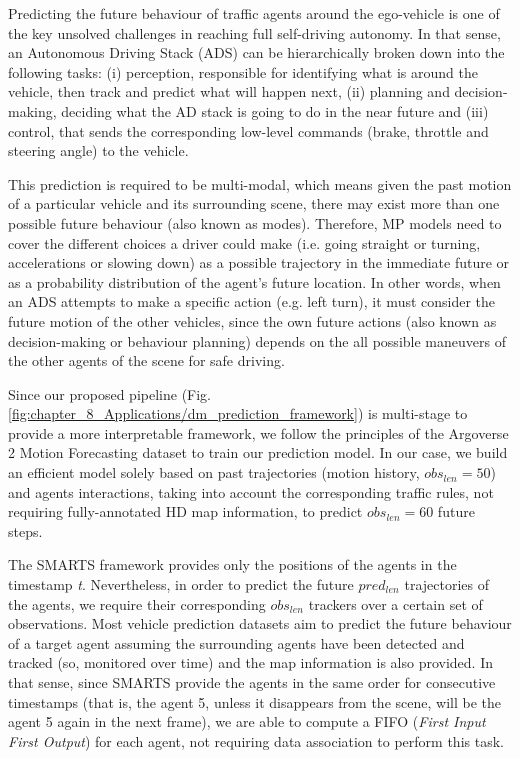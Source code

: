 Predicting the future behaviour of traffic agents \cite{wilson2023argoverse} around the ego-vehicle is one of the key unsolved challenges in reaching full self-driving autonomy. In that sense, an Autonomous Driving Stack (ADS) can be hierarchically broken down into the following tasks: (i) perception, responsible for identifying what is around the vehicle, then track and predict what will happen next, (ii) planning and decision-making, deciding what the AD stack is going to do in the near future and (iii) control, that sends the corresponding low-level commands (brake, throttle and steering angle) to the vehicle. 

This prediction is required to be multi-modal, which means given the past motion of a particular vehicle and its surrounding scene, there may exist more than one possible future behaviour (also known as modes). Therefore, MP models need to cover the different choices a driver could make (i.e. going straight or turning, accelerations or slowing down) as a possible trajectory in the immediate future or as a probability distribution of the agent's future location. In other words, when an ADS attempts to make a specific action (e.g. left turn), it must consider the future motion of the other vehicles, since the own future actions (also known as decision-making or behaviour planning) depends on the all possible maneuvers of the other agents of the scene for safe driving. %

Since our proposed pipeline (Fig. \ref{fig:chapter_8_Applications/dm_prediction_framework}) is multi-stage to provide a more interpretable framework, we follow the principles of the Argoverse 2 Motion Forecasting dataset \cite{wilson2023argoverse} to train our prediction model. In our case, we build an efficient model solely based on past trajectories (motion history, $obs_{len} = 50$) and agents interactions, taking into account the corresponding traffic rules, not requiring fully-annotated HD map information, to predict $obs_{len} = 60$ future steps. %

The SMARTS \cite{SMARTS} framework provides only the positions of the agents in the timestamp \textit{t}. Nevertheless, in order to predict the future $pred_{len}$ trajectories of the agents, we require their corresponding $obs_{len}$ trackers over a certain set of observations. Most vehicle prediction datasets \cite{wilson2023argoverse} aim to predict the future behaviour of a target agent assuming the surrounding agents have been detected and tracked (so, monitored over time) and the map information is also provided. In that sense, since SMARTS provide the agents in the same order for consecutive timestamps (that is, the agent 5, unless it disappears from the scene, will be the agent 5 again in the next frame), we are able to compute a FIFO (\textit{First Input First Output}) for each agent, not requiring data association \cite{kuhn1955hungarian} to perform this task. 

